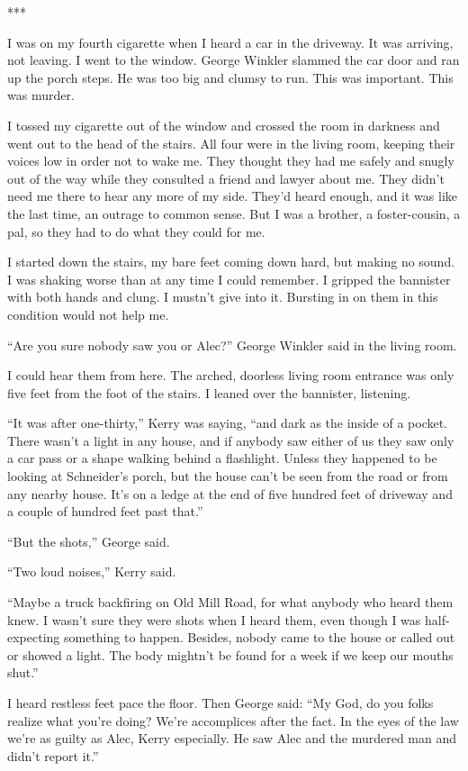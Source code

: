 \documentclass{novel}
\begin{document}
***

I was on my fourth cigarette when I heard a car in the driveway. It was arriving, not leaving. I went to the window. George Winkler slammed the car door and ran up the porch steps. He was too big and clumsy to run. This was important. This was murder.

I tossed my cigarette out of the window and crossed the room in darkness and went out to the head of the stairs. All four were in the living room, keeping their voices low in order not to wake me. They thought they had me safely and snugly out of the way while they consulted a friend and lawyer about me. They didn’t need me there to hear any more of my side. They’d heard enough, and it was like the last time, an outrage to common sense. But I was a brother, a foster-cousin, a pal, so they had to do what they could for me.

I started down the stairs, my bare feet coming down hard, but making no sound. I was shaking worse than at any time I could remember. I gripped the bannister with both hands and clung. I mustn’t give into it. Bursting in on them in this condition would not help me.

“Are you sure nobody saw you or Alec?” George Winkler said in the living room.

I could hear them from here. The arched, doorless living room entrance was only five feet from the foot of the stairs. I leaned over the bannister, listening.

“It was after one-thirty,” Kerry was saying, “and dark as the inside of a pocket. There wasn’t a light in any house, and if anybody saw either of us they saw only a car pass or a shape walking behind a flashlight. Unless they happened to be looking at Schneider’s porch, but the house can’t be seen from the road or from any nearby house. It’s on a ledge at the end of five hundred feet of driveway and a couple of hundred feet past that.”

“But the shots,” George said.

“Two loud noises,” Kerry said.

“Maybe a truck backfiring on Old Mill Road, for what anybody who heard them knew. I wasn’t sure they were shots when I heard them, even though I was half-expecting something to happen. Besides, nobody came to the house or called out or showed a light. The body mightn’t be found for a week if we keep our mouths shut.”

I heard restless feet pace the floor. Then George said: “My God, do you folks realize what you’re doing? We’re accomplices after the fact. In the eyes of the law we’re as guilty as Alec, Kerry especially. He saw Alec and the murdered man and didn’t report it.”
\end{document}
